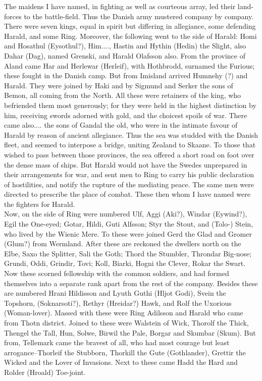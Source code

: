 \documentclass[10pt,a4paper]{report}
\begin{document}
The maidens I have named, in fighting as well as courteous array, led their land-forces to the battle-field. Thus the Danish army mustered company by company. There were seven kings, equal in spirit but differing in allegiance, some defending Harald, and some Ring. Moreover, the following went to the side of Harald: Homi and Hosathul (Eysothul?), Him...., Hastin and Hythin (Hedin) the Slight, also Dahar (Dag), named Grenski, and Harald Olafsson also. From the province of Aland came Har and Herlewar (Herleif), with Hothbrodd, surnamed the Furious; these fought in the Danish camp. But from Imisland arrived Humnehy (?) and Harald. They were joined by Haki and by Sigmund and Serker the sons of Bemon, all coming from the North. All these were retainers of the king, who befriended them most generously; for they were held in the highest distinction by him, receiving swords adorned with gold, and the choicest spoils of war. There came also.... the sons of Gandal the old, who were in the intimate favour of Harald by reason of ancient allegiance. Thus the sea was studded with the Danish fleet, and seemed to interpose a bridge, uniting Zealand to Skaane. To those that wished to pass between those provinces, the sea offered a short road on foot over the dense mass of ships. But Harald would not have the Swedes unprepared in their arrangements for war, and sent men to Ring to carry his public declaration of hostilities, and notify the rupture of the mediating peace. The same men were directed to prescribe the place of combat. These then whom I have named were the fighters for Harald.\\

Now, on the side of Ring were numbered Ulf, Aggi (Aki?), Windar (Eywind?), Egil the One-eyed; Gotar, Hildi, Guti Alfsson; Styr the Stout, and (Tolo-) Stein, who lived by the Wienic Mere. To these were joined Gerd the Glad and Gromer (Glum?) from Wermland. After these are reckoned the dwellers north on the Elbe, Saxo the Splitter, Sali the Goth; Thord the Stumbler, Throndar Big-nose; Grundi, Oddi, Grindir, Tovi; Koll, Biarki, Hogni the Clever, Rokar the Swart. Now these scorned fellowship with the common soldiers, and had formed themselves into a separate rank apart from the rest of the company. Besides these are numbered Hrani Hildisson and Lyuth Guthi (Hljot Godi), Svein the Topshorn, (Soknarsoti?), Rethyr (Hreidar?) Hawk, and Rolf the Uxorious (Woman-lover). Massed with these were Ring Adilsson and Harald who came from Thotn district. Joined to these were Walstein of Wick, Thorolf the Thick, Thengel the Tall, Hun, Solwe, Birwil the Pale, Borgar and Skumbar (Skum). But from, Tellemark came the bravest of all, who had most courage but least arrogance--Thorleif the Stubborn, Thorkill the Gute (Gothlander), Grettir the Wicked and the Lover of Invasions. Next to these came Hadd the Hard and Rolder (Hroald) Toe-joint.\\
\end{document}
